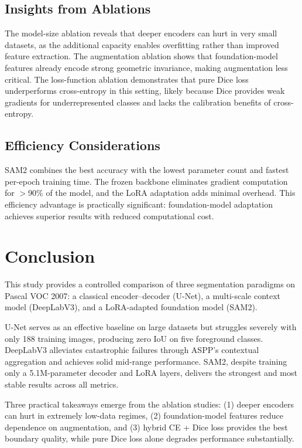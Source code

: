 \documentclass[11pt]{article}
\begin{document}
\subsection{Insights from Ablations}

The model-size ablation reveals that deeper encoders can hurt in very small datasets, as the additional capacity enables overfitting rather than improved feature extraction. The augmentation ablation shows that foundation-model features already encode strong geometric invariance, making augmentation less critical. The loss-function ablation demonstrates that pure Dice loss underperforms cross-entropy in this setting, likely because Dice provides weak gradients for underrepresented classes and lacks the calibration benefits of cross-entropy.

\subsection{Efficiency Considerations}

SAM2 combines the best accuracy with the lowest parameter count and fastest per-epoch training time. The frozen backbone eliminates gradient computation for $>$90\% of the model, and the LoRA adaptation adds minimal overhead. This efficiency advantage is practically significant: foundation-model adaptation achieves superior results with reduced computational cost.

\section{Conclusion}

This study provides a controlled comparison of three segmentation paradigms on Pascal VOC 2007: a classical encoder--decoder (U-Net), a multi-scale context model (DeepLabV3), and a LoRA-adapted foundation model (SAM2).

U-Net serves as an effective baseline on large datasets but struggles severely with only 188 training images, producing zero IoU on five foreground classes. DeepLabV3 alleviates catastrophic failures through ASPP's contextual aggregation and achieves solid mid-range performance. SAM2, despite training only a 5.1M-parameter decoder and LoRA layers, delivers the strongest and most stable results across all metrics.

Three practical takeaways emerge from the ablation studies: (1) deeper encoders can hurt in extremely low-data regimes, (2) foundation-model features reduce dependence on augmentation, and (3) hybrid CE + Dice loss provides the best boundary quality, while pure Dice loss alone degrades performance substantially.
\end{document}
